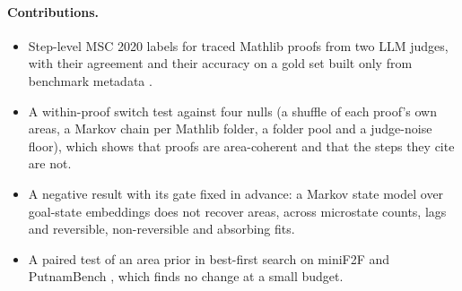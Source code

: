 \paragraph{Contributions.}
\begin{itemize}
  \item Step-level MSC 2020 labels for \resSwitchJudgeProofs{} traced Mathlib
  proofs from two LLM judges, with their agreement and their accuracy on a
  gold set built only from benchmark metadata
  \citep{zheng2022minif2f,tsoukalas2024putnambench}.
  \item A within-proof switch test against four nulls (a shuffle of each
  proof's own areas, a Markov chain per Mathlib folder, a folder pool and a
  judge-noise floor), which shows that proofs are area-coherent and that the
  steps they cite are not.
  \item A negative result with its gate fixed in advance: a Markov state model
  over goal-state embeddings \citep{yang2023leandojo} does not recover areas,
  across microstate counts, lags and reversible, non-reversible and absorbing
  fits.
  \item A paired test of an area prior in best-first search on miniF2F
  \citep{zheng2022minif2f} and PutnamBench
  \citep{tsoukalas2024putnambench}, which finds no change at a small budget.
\end{itemize}
